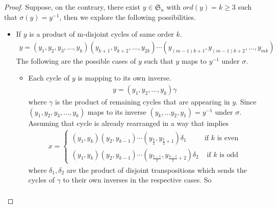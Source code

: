 \documentclass[10pt,a4paper]{amsart}
\newcommand{\ord}{ord}
\begin{document}
        \begin{proof}
            Suppose, on the contrary, there exist $y \in \mathfrak{S}_n$ with $\ord (y) = k \geq 3$ such that $\sigma(y) = y^{-1}$, then we explore the following possibilities.
            \begin{itemize}
                \item[Case A.] If $y$ is a product of m-disjoint cycles of same order $k$.
                \begin{align*}
                    y = (y_1, y_2, y_3, \ldots , y_k)(y_{k + 1}, y_{k + 2}, \ldots, y_{2k})\cdots(y_{(m - 1)k + 1}, y_{(m - 1)k + 2}, \ldots ,y_{mk})
                \end{align*}
                The following are the possible cases of $y$ such that $y$ maps to $y^{-1}$ under $\sigma$. 
                \begin{itemize}
                    \item[Case (1)] Each cycle of $y$ is mapping to its own inverse.
                    \begin{align*}
                        y = (y_1, y_2, \ldots, y_k)\gamma
                    \end{align*}
                    where $\gamma$ is the product of remaining cycles that are appearing in $y$. Since $(y_1, y_2, y_3, \ldots , y_k)$ maps to its inverse $(y_k, \ldots y_2, y_1) = y^{-1}$ under $\sigma$. Assuming that cycle is already rearranged in a way that implies
                    \begin{align*}
                        x = \begin{cases}
                            (y_1, y_k)(y_2, y_{k - 1})\cdots(y_{\frac{k}{2}}, y_{\frac{k}{2} + 1})\delta_1 & \text{if } k \text{ is even}\\
                            (y_1, y_k)(y_2, y_{k - 1})\cdots(y_{\frac{k - 1}{2}}, y_{\frac{k - 1}{2} + 2})\delta_2 & \text{ if } k \text{ is odd}
                        \end{cases}
                    \end{align*}
                    where $\delta_1, \delta_2$ are the product of disjoint transpositions which sends the cycles of $\gamma$ to their own inverses in the respective cases. So
                    \begin{align*}

\end{align*}
\end{itemize}
\end{itemize}
\end{proof}
\end{document}
